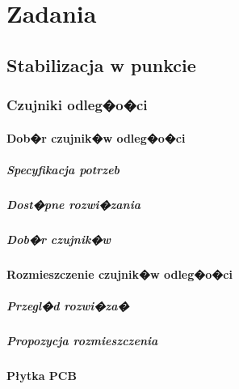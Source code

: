 \documentclass[12pt,a4paper,twoside,openright,fleqn]{mwrep}
\begin{document}
\part{Zadania}
\chapter{Stabilizacja w punkcie}

	\section{Czujniki odleg�o�ci}
	
		\subsection{Dob�r czujnik�w odleg�o�ci}
		
			\subsubsection{Specyfikacja potrzeb}
				
			\subsubsection{Dost�pne rozwi�zania}
			
			\subsubsection{Dob�r czujnik�w}
			
		\subsection{Rozmieszczenie czujnik�w odleg�o�ci}
		
			\subsubsection{Przegl�d rozwi�za�}
			
			\subsubsection{Propozycja rozmieszczenia}
			
		\subsection{Płytka PCB}
\end{document}
